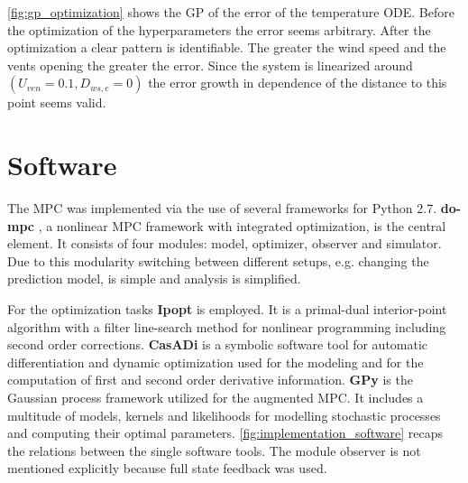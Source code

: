 \cref{fig:gp_optimization} shows the GP of the error of the temperature ODE.
Before the optimization of the hyperparameters the error seems arbitrary.
After the optimization a clear pattern is identifiable.
The greater the wind speed and the vents opening the greater the error.
Since the system is linearized around $(U_{ven} = 0.1, D_{ws,e} = 0)$ the error growth in dependence of the distance to this point seems valid.



\section{Software}
\label{sec:software}

The MPC was implemented via the use of several frameworks for Python 2.7.
\textbf{do-mpc} \cite{Lucia.2017}, a nonlinear MPC framework with integrated optimization, is the central element.
It consists of four modules: model, optimizer, observer and simulator.
Due to this modularity switching between different setups, e.g. changing the prediction model, is simple and analysis is simplified.

For the optimization tasks \textbf{Ipopt} \cite{Wachter.2006} is employed.
It is a primal-dual interior-point algorithm with a filter line-search method for nonlinear programming including second order corrections.
\textbf{CasADi} \cite{Andersson.01.01.2013} is a symbolic software tool for automatic differentiation and dynamic optimization used for the modeling and for the computation of first and second order derivative information.
\textbf{GPy} \cite{GPy.since2012} is the Gaussian process framework utilized for the augmented MPC. It includes a multitude of models, kernels and likelihoods for modelling stochastic processes and computing their optimal parameters.
\cref{fig:implementation_software} recaps the relations between the single software tools.
The module observer is not mentioned explicitly because full state feedback was used.\par\medskip

